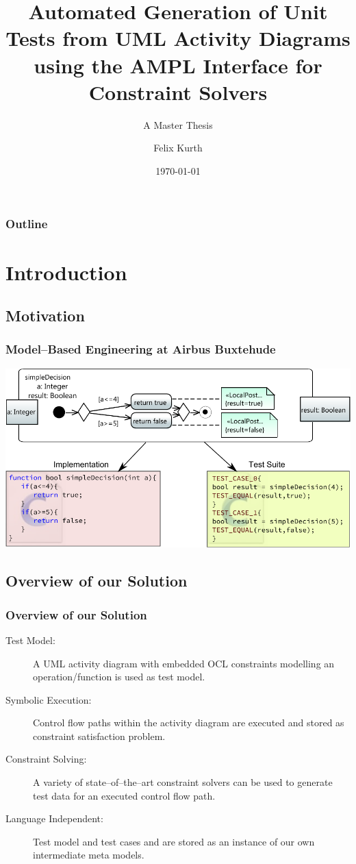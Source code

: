 \documentclass{beamer}
\title[Automated Generation of Unit Tests]{Automated Generation of Unit Tests from UML Activity Diagrams using the AMPL Interface for Constraint Solvers}
\subtitle[M.Sc. Thesis]{A Master Thesis}
\author[F. Kurth]{Felix Kurth}
\date[Jan 2014]{\today}
\begin{document}
\begin{frame}
\titlepage
\end{frame}

\begin{frame}
\frametitle{Outline} 
\tableofcontents  
\end{frame}


\section{Introduction}
\subsection{Motivation}
\begin{frame}
\frametitle{Model--Based Engineering at Airbus Buxtehude}
\includegraphics[width=\textwidth]{../Thesis/pics/BasicExamplesSimpleDecision.pdf}
\end{frame}
\subsection{Overview of our Solution}
\begin{frame}
\frametitle{Overview of our Solution}
\begin{description}
\item[Test Model:] A UML activity diagram with embedded OCL constraints modelling an operation/function is used as test model.
\item[Symbolic Execution:] Control flow paths within the activity diagram are executed and stored as constraint satisfaction problem.
\item[Constraint Solving:] A variety of state--of--the--art constraint solvers can be used to generate test data for an executed control flow path.
\item[Language Independent:] Test model and test cases and are stored as an instance of our own intermediate meta models.
\end{description}
\end{frame}
\end{document}
